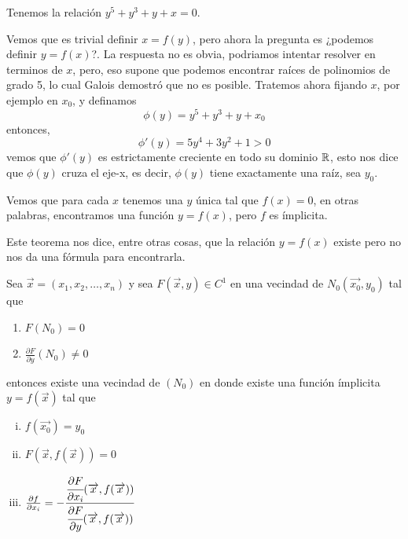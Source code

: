 \begin{example}
    Tenemos la relaci\'on $y^{5}+y^{3}+y+x=0$.
\end{example}

    Vemos que es trivial definir $x=f(y)$, pero ahora la pregunta es ¿podemos
    definir $y=f(x)$?. La respuesta no es obvia, podriamos intentar resolver
    en terminos de $x$, pero, eso supone que podemos encontrar ra\'ices de 
    polinomios de grado 5, lo cual Galois demostró que no es posible. Tratemos
    ahora fijando $x$, por ejemplo en $x_{0}$, y definamos
    $$ \phi(y)=y^{5}+y^{3}+y+x_{0}$$
    entonces,
    $$\phi'(y)=5y^{4}+3y^{2}+1 > 0$$
    vemos que $\phi'(y)$ es estrictamente creciente en todo su dominio $\mathbb{R}$,
    esto nos dice que $\phi(y)$ cruza el eje-x, es decir, $\phi(y)$ tiene exactamente
    una ra\'iz, sea $y_{0}$.

    Vemos que para cada $x$ tenemos una $y$ \'unica tal que $f(x)=0$, en otras
    palabras, encontramos una funci\'on $y=f(x)$, pero $f$ es \'implicita.

    Este teorema nos dice, entre otras cosas, que la relaci\'on $y=f(x)$
    existe pero no nos da una f\'ormula para encontrarla.

\clearpage

\begin{theorem}
    Sea $\overrightarrow{x} = (x_{1},x_{2},\ldots,x_{n})$ y sea $F(\overrightarrow{x},y) \in C^{1}$ 
    en una vecindad de $N_{0}(\overrightarrow{x_{0}},y_{0})$ tal que
    \begin{enumerate}
        \item $F(N_{0}) = 0$
        \item $\frac{\partial F}{\partial y}(N_{0}) \ne 0$
    \end{enumerate}
    entonces existe una vecindad de $(N_{0})$ en donde existe una
    funci\'on \'implicita $y=f(\overrightarrow{x})$ tal que
    \begin{enumerate}[i.]
        \item $f(\overrightarrow{x_{0}}) = y_{0}$
        \item $F(\overrightarrow{x}, f(\overrightarrow{x})) = 0$
        \item $\frac{\partial f}{\partial x_{i}} = -\cfrac{\cfrac{\partial F}{\partial x_{i}}(\overrightarrow{x},f(\overrightarrow{x}))}{\cfrac{\partial F}{\partial y}(\overrightarrow{x},f(\overrightarrow{x}))}$
    \end{enumerate}
\end{theorem}

